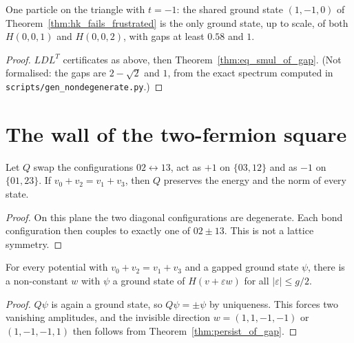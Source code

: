 \begin{theorem}
  \label{thm:frustrated_nondeg}
  \leanok
  One particle on the triangle with $t=-1$: the shared ground state $(1,-1,0)$ of
  Theorem~\ref{thm:hk_fails_frustrated} is the only ground state, up to scale, of both $H(0,0,1)$ and $H(0,0,2)$,
  with gaps at least $0.58$ and $1$.
\end{theorem}
\begin{proof}
  \leanok
  $LDL^T$ certificates as above, then Theorem~\ref{thm:eq_smul_of_gap}. (Not formalised: the gaps are $2-\sqrt2$
  and $1$, from the exact spectrum computed in \texttt{scripts/gen\_nondegenerate.py}.)
\end{proof}

\section{The wall of the two-fermion square}

\begin{lemma}
  \label{lem:Qsq}
  \leanok
  Let $Q$ swap the configurations $02\leftrightarrow13$, act as $+1$ on $\{03,12\}$ and as $-1$ on
  $\{01,23\}$. If $v_0+v_2=v_1+v_3$, then $Q$ preserves the energy and the norm of every state.
\end{lemma}
\begin{proof}
  \leanok
  On this plane the two diagonal configurations are degenerate. Each bond configuration then couples to
  exactly one of $02\pm13$. This is not a lattice symmetry.
\end{proof}

\begin{theorem}
  \label{thm:square_wall}
  \leanok
  For every potential with $v_0+v_2=v_1+v_3$ and a gapped ground state $\psi$, there is a non-constant $w$
  with $\psi$ a ground state of $H(v+\varepsilon w)$ for all $|\varepsilon|\le g/2$.
\end{theorem}
\begin{proof}
  \leanok
  $Q\psi$ is again a ground state, so $Q\psi=\pm\psi$ by uniqueness. This forces two vanishing amplitudes,
  and the invisible direction $w=(1,1,-1,-1)$ or $(1,-1,-1,1)$ then follows from
  Theorem~\ref{thm:persist_of_gap}.
\end{proof}

